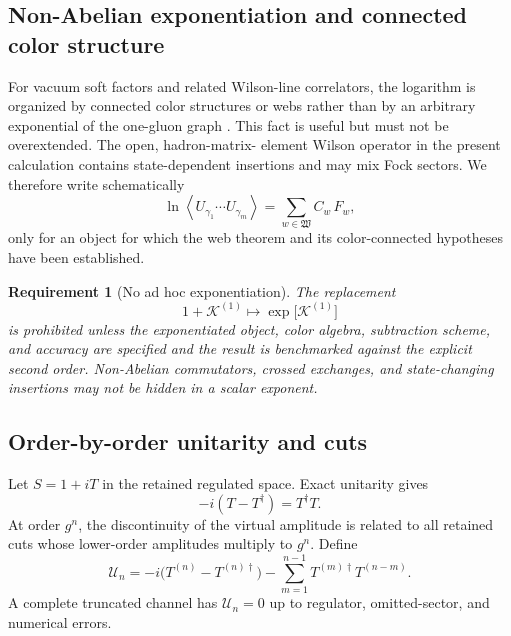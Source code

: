 \documentclass[11pt]{article}
\newtheorem{requirement}[definition]{Requirement}
\newcommand{\cK}{\mathcal K}
\newcommand{\cU}{\mathcal U}
\newcommand{\avg}[1]{\left\langle #1\right\rangle}
\begin{document}
\subsection{Non-Abelian exponentiation and connected color structure}

For vacuum soft factors and related Wilson-line correlators, the logarithm is
organized by connected color structures or webs rather than by an arbitrary
exponential of the one-gluon graph \cite{Gatheral1983,FrenkelTaylor1984}.
This fact is useful but must not be overextended.  The open, hadron-matrix-
element Wilson operator in the present calculation contains state-dependent
insertions and may mix Fock sectors.  We therefore write schematically
\begin{equation}
 \ln \avg{U_{\gamma_1}\cdots U_{\gamma_m}}
 =\sum_{w\in\mathfrak W}
 C_w\,F_w,
\label{eq:web-expansion}
\end{equation}
only for an object for which the web theorem and its color-connected
hypotheses have been established.

\begin{requirement}[No ad hoc exponentiation]
\label{req:no-ad-hoc-exponentiation}
The replacement
\begin{equation}
 1+\cK^{(1)}\longmapsto \exp\!\bigl[\cK^{(1)}\bigr]
\label{eq:forbidden-eikonal-exponent}
\end{equation}
is prohibited unless the exponentiated object, color algebra, subtraction
scheme, and accuracy are specified and the result is benchmarked against the
explicit second order.  Non-Abelian commutators, crossed exchanges, and
state-changing insertions may not be hidden in a scalar exponent.
\end{requirement}

\subsection{Order-by-order unitarity and cuts}

Let \(S=1+iT\) in the retained regulated space.  Exact unitarity gives
\begin{equation}
 -i(T-T^\dagger)=T^\dagger T.
\label{eq:unitarity-operator}
\end{equation}
At order \(g^n\), the discontinuity of the virtual amplitude is related to
all retained cuts whose lower-order amplitudes multiply to \(g^n\).  Define
\begin{equation}
 \cU_n
 =-i\bigl(T^{(n)}-T^{(n)\dagger}\bigr)
 -\sum_{m=1}^{n-1}T^{(m)\dagger}T^{(n-m)}.
\label{eq:unitarity-residual-order-n}
\end{equation}
A complete truncated channel has \(\cU_n=0\) up to regulator, omitted-sector,
and numerical errors.
\end{document}
